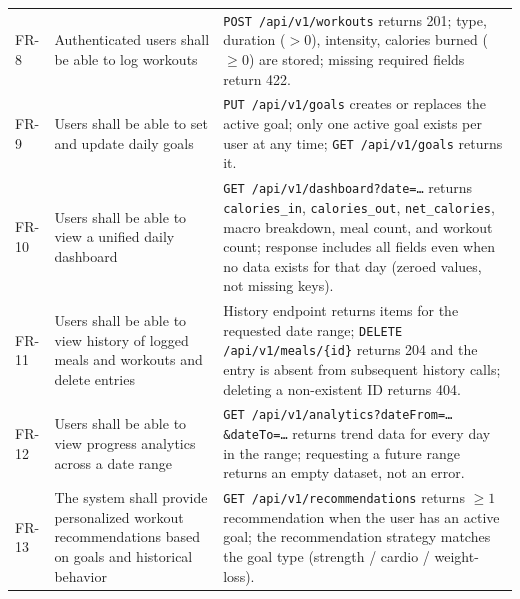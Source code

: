 \documentclass[11pt]{article}
\begin{document}
\begin{longtable}{p{1.2cm} p{5.8cm} p{6.5cm}}
  FR-8  & Authenticated users shall be able to log workouts
        & \texttt{POST /api/v1/workouts} returns 201; type, duration ($> 0$), intensity,
          calories burned ($\geq 0$) are stored; missing required fields return 422. \\[2pt]

  FR-9  & Users shall be able to set and update daily goals
        & \texttt{PUT /api/v1/goals} creates or replaces the active goal; only one active
          goal exists per user at any time; \texttt{GET /api/v1/goals} returns it. \\[2pt]

  FR-10 & Users shall be able to view a unified daily dashboard
        & \texttt{GET /api/v1/dashboard?date=\ldots} returns \texttt{calories\_in},
          \texttt{calories\_out}, \texttt{net\_calories}, macro breakdown, meal count, and
          workout count; response includes all fields even when no data exists for that day
          (zeroed values, not missing keys). \\[2pt]

  FR-11 & Users shall be able to view history of logged meals and workouts and delete entries
        & History endpoint returns items for the requested date range; \texttt{DELETE
          /api/v1/meals/\{id\}} returns 204 and the entry is absent from subsequent history
          calls; deleting a non-existent ID returns 404. \\[2pt]

  FR-12 & Users shall be able to view progress analytics across a date range
        & \texttt{GET /api/v1/analytics?dateFrom=\ldots\&dateTo=\ldots} returns trend
          data for every day in the range; requesting a future range returns an empty
          dataset, not an error. \\[2pt]

  FR-13 & The system shall provide personalized workout recommendations based on goals
          and historical behavior
        & \texttt{GET /api/v1/recommendations} returns $\geq 1$ recommendation when the
          user has an active goal; the recommendation strategy matches the goal type
          (strength / cardio / weight-loss). \\

  \bottomrule
\end{longtable}


\end{document}
